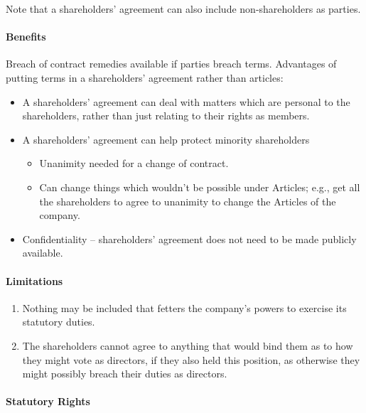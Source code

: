\documentclass[
]{article}
\providecommand{\tightlist}{%
  \setlength{\itemsep}{0pt}\setlength{\parskip}{0pt}}
\begin{document}
Note that a shareholders' agreement can also include non-shareholders as
parties.

\hypertarget{benefits}{%
\paragraph{Benefits}\label{benefits}}

Breach of contract remedies available if parties breach terms.
Advantages of putting terms in a shareholders' agreement rather than
articles:

\begin{itemize}
\tightlist
\item
  A shareholders' agreement can deal with matters which are personal to
  the shareholders, rather than just relating to their rights as
  members.
\item
  A shareholders' agreement can help protect minority shareholders

  \begin{itemize}
  \tightlist
  \item
    Unanimity needed for a change of contract.
  \item
    Can change things which wouldn't be possible under Articles; e.g.,
    get all the shareholders to agree to unanimity to change the
    Articles of the company.
  \end{itemize}
\item
  Confidentiality -- shareholders' agreement does not need to be made
  publicly available.
\end{itemize}

\hypertarget{limitations}{%
\paragraph{Limitations}\label{limitations}}

\begin{enumerate}
\def\labelenumi{\arabic{enumi}.}
\tightlist
\item
  Nothing may be included that fetters the company's powers to exercise
  its statutory duties.
\item
  The shareholders cannot agree to anything that would bind them as to
  how they might vote as directors, if they also held this position, as
  otherwise they might possibly breach their duties as directors.
\end{enumerate}

\hypertarget{statutory-rights}{%
\paragraph{Statutory Rights}\label{statutory-rights}}
\end{document}
